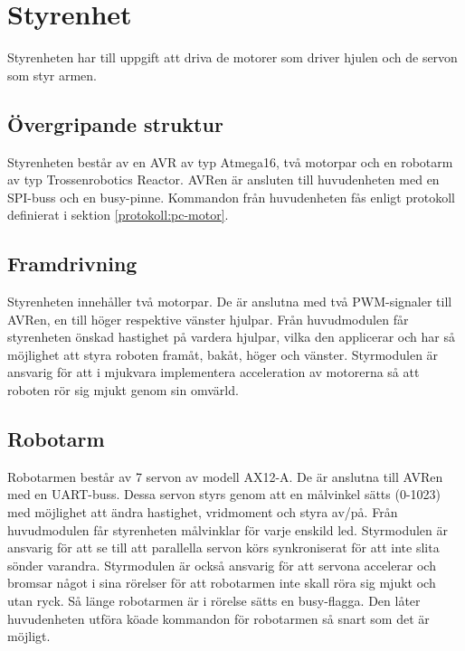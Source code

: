 
\section{Styrenhet}

Styrenheten har till uppgift att driva de motorer som driver hjulen och de servon som styr armen.

\subsection{Övergripande struktur}

Styrenheten består av en AVR av typ Atmega16, två motorpar och en robotarm av typ Trossenrobotics Reactor. AVRen är ansluten till huvudenheten med en SPI-buss och en busy-pinne. Kommandon från huvudenheten fås enligt protokoll definierat i sektion \ref{protokoll:pc-motor}.\\


\subsection{Framdrivning}

Styrenheten innehåller två motorpar. De är anslutna med två PWM-signaler till AVRen, en till höger respektive vänster hjulpar. Från huvudmodulen får styrenheten önskad hastighet på vardera hjulpar, vilka den applicerar och har så möjlighet att styra roboten framåt, bakåt, höger och vänster. Styrmodulen är ansvarig för att i mjukvara implementera acceleration av motorerna så att roboten rör sig mjukt genom sin omvärld.

\subsection{Robotarm}

Robotarmen består av 7 servon av modell AX12-A. De är anslutna till AVRen med en UART-buss. Dessa servon styrs genom att en målvinkel sätts (0-1023) med möjlighet att ändra hastighet, vridmoment och styra av/på. Från huvudmodulen får styrenheten målvinklar för varje enskild led. Styrmodulen är ansvarig för att se till att parallella servon körs synkroniserat för att inte slita sönder varandra. Styrmodulen är också ansvarig för att servona accelerar och bromsar något i sina rörelser för att robotarmen inte skall röra sig mjukt och utan ryck. Så länge robotarmen är i rörelse sätts en busy-flagga. Den låter huvudenheten utföra köade kommandon för robotarmen så snart som det är möjligt. 

